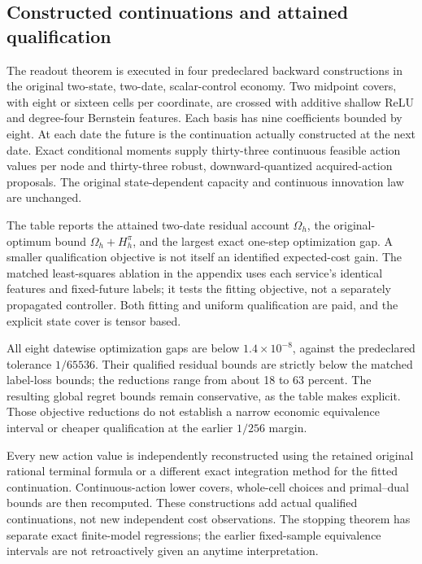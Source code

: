 \subsection{Constructed continuations and attained qualification}\label{sec:study73}
The readout theorem is executed in four predeclared backward constructions in the original two-state, two-date, scalar-control economy. Two midpoint covers, with eight or sixteen cells per coordinate, are crossed with additive shallow ReLU and degree-four Bernstein features. Each basis has nine coefficients bounded by eight. At each date the future is the continuation actually constructed at the next date. Exact conditional moments supply thirty-three continuous feasible action values per node and thirty-three robust, downward-quantized acquired-action proposals. The original state-dependent capacity and continuous innovation law are unchanged.



The table reports the attained two-date residual account $\Omega_h$, the original-optimum bound $\Omega_h+H_h^\pi$, and the largest exact one-step optimization gap. A smaller qualification objective is not itself an identified expected-cost gain. The matched least-squares ablation in the appendix uses each service's identical features and fixed-future labels; it tests the fitting objective, not a separately propagated controller. Both fitting and uniform qualification are paid, and the explicit state cover is tensor based.

All eight datewise optimization gaps are below $1.4\times10^{-8}$, against the predeclared tolerance $1/65536$. Their qualified residual bounds are strictly below the matched label-loss bounds; the reductions range from about 18 to 63 percent. The resulting global regret bounds remain conservative, as the table makes explicit. Those objective reductions do not establish a narrow economic equivalence interval or cheaper qualification at the earlier $1/256$ margin.

Every new action value is independently reconstructed using the retained original rational terminal formula or a different exact integration method for the fitted continuation. Continuous-action lower covers, whole-cell choices and primal--dual bounds are then recomputed. These constructions add actual qualified continuations, not new independent cost observations. The stopping theorem has separate exact finite-model regressions; the earlier fixed-sample equivalence intervals are not retroactively given an anytime interpretation.
